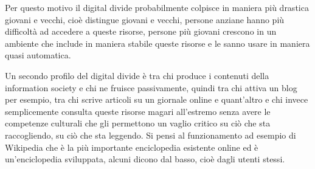 Per questo motivo il digital divide probabilmente colpisce in maniera più drastica giovani e vecchi, cioè distingue giovani e vecchi, persone anziane hanno più difficoltà ad accedere a queste risorse, persone più giovani crescono in un ambiente che include in maniera stabile queste risorse e le sanno usare in maniera quasi automatica.\par 
Un secondo profilo del digital divide è tra chi produce i contenuti della information society e chi ne fruisce passivamente, quindi tra chi attiva un blog per esempio, tra chi scrive articoli su un giornale online e quant'altro e chi invece semplicemente consulta queste risorse magari all'estremo senza avere le competenze culturali che gli permettono un vaglio critico su ciò che sta raccogliendo, su ciò che sta leggendo. Si pensi al funzionamento ad esempio di Wikipedia che è la più importante enciclopedia esistente online ed è un'enciclopedia sviluppata, alcuni dicono dal basso, cioè dagli utenti stessi. 

